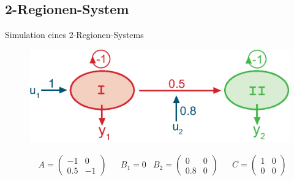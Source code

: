 \documentclass{beamer}
\begin{document}
\subsection{2-Regionen-System}
	\begin{frame}{Simulation eines 2-Regionen-Systems}
		\begin{figure}
			{\includegraphics[width=0.8\linewidth]{res/bilinearesModel_bunt_lin_werte.eps}}
		\end{figure}
		\begin{align*}
		& A  =
		\begin{pmatrix}
		-1 & 0 \\ 0.5 & -1 
		\end{pmatrix} &
		& B_1 = 0  
		 & B_2 =
		\begin{pmatrix}
		0 & 0 \\ 0.8 &  0
		\end{pmatrix} & 
		 & C =
		\begin{pmatrix}
		1 & 0 \\  0 &  0
		\end{pmatrix} 
		\end{align*}
	\end{frame}
\end{document}
